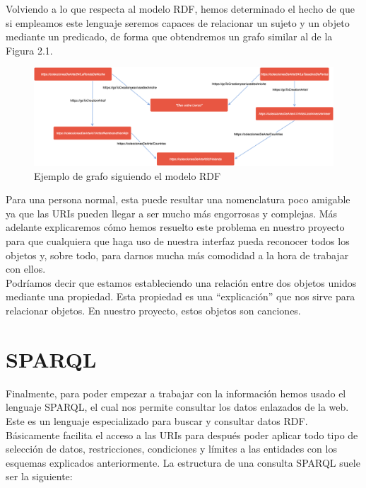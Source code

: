 Volviendo a lo que respecta al modelo RDF, hemos determinado el hecho de que si empleamos este lenguaje seremos capaces de relacionar un sujeto y un objeto mediante un predicado, de forma que obtendremos un grafo similar al de la Figura 2.1.\\

\begin{figure}[h!]
	\centering
	\includegraphics[width = 1\textwidth]{Imagenes/Bitmap/RDFexample.png}
	\caption{Ejemplo de grafo siguiendo el modelo RDF}
	\label{fig:sampleImage}
\end{figure}

Para una persona normal, esta puede resultar una nomenclatura poco amigable ya que las URIs pueden llegar a ser mucho más engorrosas y complejas. Más adelante explicaremos cómo hemos resuelto este problema en nuestro proyecto para que cualquiera que haga uso de nuestra interfaz pueda reconocer todos los objetos y, sobre todo, para darnos mucha más comodidad a la hora de trabajar con ellos.\\

Podríamos decir que estamos estableciendo una relación entre dos objetos unidos mediante una propiedad. Esta propiedad es una ``explicación'' que nos sirve para relacionar objetos. En nuestro proyecto, estos objetos son canciones.\\

\section{SPARQL}

Finalmente, para poder empezar a trabajar con la información hemos usado el lenguaje SPARQL, el cual nos permite consultar los datos enlazados de la web. Este es un lenguaje especializado para buscar y consultar datos RDF. Básicamente facilita el acceso a las URIs para después poder aplicar todo tipo de selección de datos, restricciones, condiciones y límites a las entidades con los esquemas explicados anteriormente. La estructura de una consulta SPARQL suele ser la siguiente:\\

